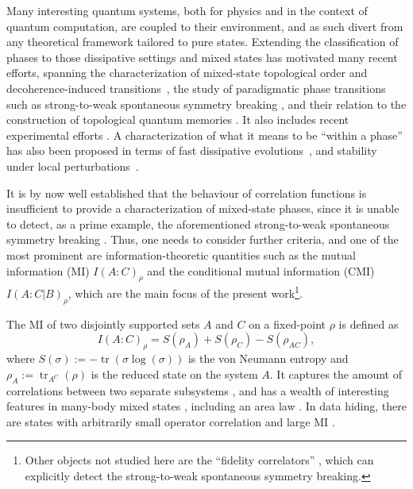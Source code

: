 \documentclass[11pt]{article}
\numberwithin{equation}{section}
\numberwithin{figure}{section}
\numberwithin{table}{section}
\theoremstyle{definition}
\theoremstyle{plain}
\theoremstyle{remark}
\newcommand{\tr}{\operatorname{tr}}
\begin{document}
Many interesting quantum systems, both for physics and in the context of quantum computation, are coupled to their environment, and as such divert from any theoretical framework tailored to pure states.
Extending the classification of phases to those dissipative settings and mixed states has motivated many recent efforts, spanning the characterization of mixed-state topological order and decoherence-induced transitions~\cite{Bao2023,Lee_2023,Fan+24,Chen_2024,sang2026mixedstatequantumphasesrenormalization,wang2025fractionalquantumhallstates}, the study of paradigmatic phase transitions such as strong-to-weak spontaneous symmetry breaking \cite{Bu_a_2012,Lieu_2020,de_Groot_2022,Sala_2024,Ma_2025,Lessa_2025,wang2026strongtoweakspontaneoussymmetrybreaking}, and their relation to the construction of topological quantum memories \cite{Dennis2002,Sang_Renormalization_2024}. It also includes recent experimental efforts \cite{wang2026observationstrongtoweakspontaneoussymmetry,zhang2025probingmixedstatephasesquantum}. 
A characterization of what it means to be ``within a phase'' has also been proposed in terms of fast dissipative evolutions~\cite{coser_classification_2019,rakovszky_defining_2024}, and stability under local perturbations~\cite{rakovszky_defining_2024, sang_mixed-state_2025, li_unified_2026}.  

It is by now well established that the behaviour of correlation functions is insufficient to provide a characterization of mixed-state phases, since it is unable to detect, as a prime example, the aforementioned strong-to-weak spontaneous symmetry breaking \cite{Lee_2023,Sala_2024,Ma_SPT_2025,Lessa_2025,shu2026universaldynamicalscalingstrongtoweak}. Thus, one needs to consider further criteria, and one of the most prominent are information-theoretic quantities such as the mutual information (MI) $I(A:C)_\rho$ and the conditional mutual information (CMI) $I(A:C|B)_\rho$, which are the main focus of the present work\footnote{Other objects not studied here are the ``fidelity correlators'' \cite{Lessa_2025,Weinstein_2025,Liu2025,Zhang_2026}, which can explicitly detect the strong-to-weak spontaneous symmetry breaking.}. 

The MI of two disjointly supported sets $A$ and $C$ on a fixed-point $\rho$ is defined as
\begin{equation}
    I(A:C)_\rho = S(\rho_A)+S(\rho_C)-S(\rho_{AC}),
\end{equation}
where $S(\sigma):=-\tr(\sigma \log(\sigma))$ is the von Neumann entropy and $\rho_A:=\tr_{A^C}(\rho)$ is the reduced state on the system $A$. It captures the amount of correlations between two separate subsystems \cite{Groisman_2005}, and has a wealth of interesting features in many-body mixed states \cite{Melko_2010,Scalet_2021,Bluhm_2022,yi2025universaldecayconditionalmutual}, including an area law \cite{wolf_area_2008}. 
In data hiding, there are states with arbitrarily small operator correlation and large MI \cite{Hastings2007b, Hayden2004}.
\end{document}
